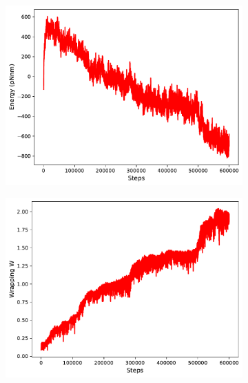 \documentclass[a4paper,10pt]{article}
\begin{document}
\begin{figure}[tb]
\centering
\begin{subfigure}{.33\textwidth}
\includegraphics[width=\textwidth]{hist_energy.pdf}
\caption{}
\label{fig:hist_en}
\end{subfigure}
\begin{subfigure}{.33\textwidth}
\includegraphics[width=\textwidth]{hist_wrapping.pdf}
\caption{}
\label{fig:hist_wr}
\end{subfigure}
\\
\begin{subfigure}{.33\textwidth}

\end{subfigure}
\end{figure}
\end{document}
